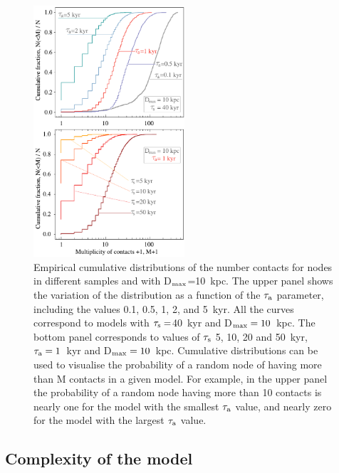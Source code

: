 \documentclass[crop]{CSLB}
\newcommand{\cetis}{nodes}
\begin{document}
 
\begin{figure} \centering
   \includegraphics[width=0.5\textwidth]{F_number_of_contacts.pdf}
   \caption{
Empirical cumulative distributions of the number contacts
   for \cetis{} in different samples and with D$_{\rm max}$=10~kpc.
%
The upper panel shows the variation of the distribution
   as a function of the $\tau_{\rm a}$ parameter, including the values 
   0.1, 0.5, 1, 2, and 5~kyr. All the curves
   correspond to models with 
   $\tau_{\rm s}=$40~kyr and \mbox{D$_{\rm max}=10$~kpc}.
%
   The bottom panel corresponds to values of $\tau_{\rm s}$
   5, 10, 20 and 50~kyr,
   $\tau_{\rm a}=1$~kyr and D$_{\rm max}=10$~kpc.
%
   Cumulative distributions can be used to visualise the probability
   of a random node of having more than M contacts in a given model.  For
   example, in the upper panel the probability of a random node having
   more than 10 contacts is nearly one for the model with the
   smallest $\tau_{\rm a}$ value, and nearly zero for the model with the
   largest $\tau_{\rm a}$ value.
   } \label{F_number_of_contacts}
\end{figure}
        
 

\subsection{Complexity of the model}
\end{document}
